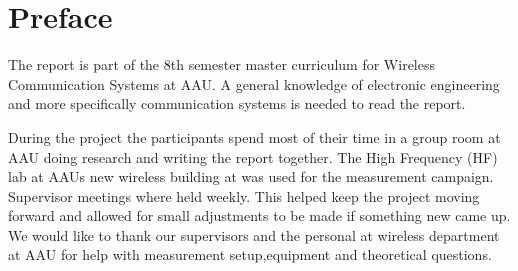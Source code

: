 \chapter*{Preface}\label{ch:forord}%
The report is part of the 8th semester master curriculum for Wireless Communication Systems at \gls{AAU}. A general knowledge of electronic engineering and more specifically communication systems is needed to read the report.

During the project the participants spend most of their time in a group room at \gls{AAU} doing research and writing the report together. The High Frequency (HF) lab at \gls{AAU}s new wireless building at was used for the measurement campaign. Supervisor meetings where held weekly. This helped keep the project moving forward and allowed for small adjustments to be made if something new came up. We would like to thank our supervisors and the personal at wireless department at \gls{AAU} for help with measurement setup,equipment and theoretical questions.

